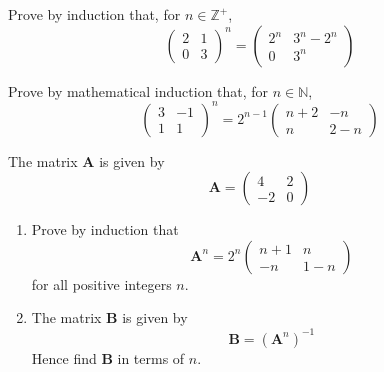 \documentclass[leqno]{article}
\begin{document}
\djsFrontMatter
\begin{enumerate}[
  label=\textbf{\arabic*.},
  leftmargin=*,
  topsep=0pt,
  partopsep=0pt,
  parsep=0pt
]

\questionitem

Prove by induction that, for $n \in \mathbb{Z}^+$,
\[
\renewcommand{\arraystretch}{1.2}
\begin{pmatrix} 2 & 1 \\ 0 & 3 \end{pmatrix}^n = \begin{pmatrix} 2^n & 3^n - 2^n \\ 0 & 3^n \end{pmatrix}
\]

\newpage


\questionitem

Prove by mathematical induction that, for $n \in \mathbb{N}$,
\[
\begin{pmatrix}
3 & -1 \\
1 & 1
\end{pmatrix}^n = 2^{n-1}
\begin{pmatrix}
n+2 & -n \\
n & 2-n
\end{pmatrix}
\]

\newpage

\questionitem

The matrix $\mathbf{A}$ is given by
\[
\mathbf{A} = \begin{pmatrix} 4 & 2 \\ -2 & 0 \end{pmatrix}
\]
\begin{enumerate}[label=\textbf{(\alph*)}]
  \item Prove by induction that
  \[
  \mathbf{A}^n = 2^n \begin{pmatrix} n+1 & n \\ -n & 1-n \end{pmatrix}
  \]
  for all positive integers $n$.  \\
  \item The matrix $\mathbf{B}$ is given by
  \[
  \mathbf{B} = (\mathbf{A}^n)^{-1}
  \]
  Hence find $\mathbf{B}$ in terms of $n$.  \\
\end{enumerate}


\end{enumerate}
\end{document}
